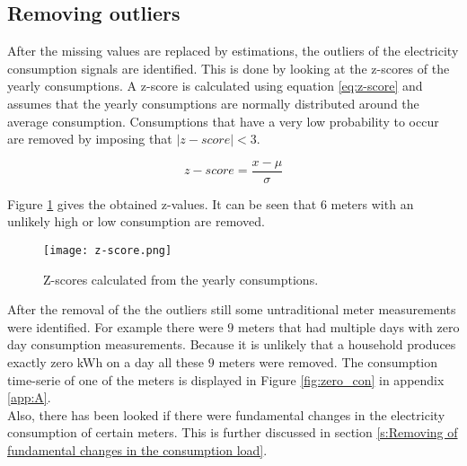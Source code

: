 \subsection{Removing outliers}
After the missing values are replaced by estimations, the outliers of the electricity consumption signals are identified.
This is done by looking  at the z-scores of the yearly consumptions. A z-score is calculated using equation \ref{eq:z-score} and assumes that the yearly consumptions are normally distributed around the average consumption. Consumptions that have a very low probability to occur are removed by imposing that $ |z-score| < 3 $.

\begin{equation}
	z-score = \frac{x-\mu}{\sigma}
\end{equation}                      

Figure \ref{fig:z-score} gives the obtained z-values. It can be seen that $ 6 $ meters with an unlikely high or low consumption are removed. 

\begin{figure}[h!]
	\centering
	\texttt{[image: z-score.png]}
	\caption{Z-scores calculated from the yearly consumptions.}
	\label{fig:z-score}
\end{figure}

After the removal of the the outliers still some untraditional meter measurements were identified. For example there were $ 9 $ meters that had multiple days with zero day consumption measurements. Because it is unlikely that a household produces exactly zero kWh on a day all these $ 9 $ meters were removed. The consumption time-serie of one of the meters is displayed in Figure \ref{fig:zero_con} in appendix \ref{app:A}.\\

Also, there has been looked if there were fundamental changes in the electricity consumption of certain meters. This is further discussed in section \ref{s:Removing of fundamental changes in the consumption load}.


